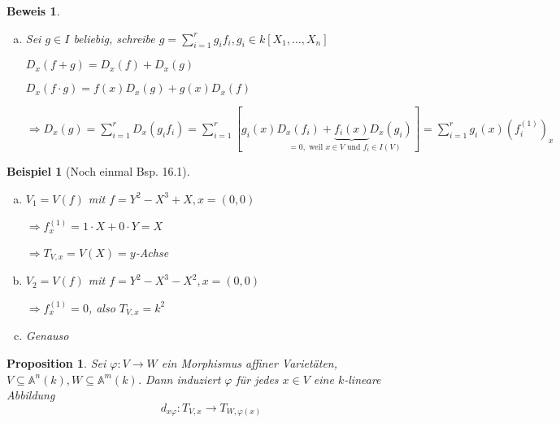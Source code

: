 \documentclass[a4paper, 12pt, numbers=noendperiod, chapterprefix=true, headsepline]{scrbook}
\theoremstyle{break}
\newtheorem{Prop}[Def]{Proposition}
\theoremstyle{nonumberbreak}
\newtheorem{nnBsp}{Beispiel}
\newtheorem{Bew}{Beweis}
\theoremstyle{nonumberplain}
\newcommand{\Sum}{\sum\limits}
\newcommand{\A}{\mathbb{A}}
\begin{document}
\begin{Bew}\begin{enumerate}[a)]\item[c)]
Sei $g\in I$ beliebig, schreibe $g=\Sum_{i=1}^r g_if_i, g_i\in k[X_1,\ldots ,X_n]$

$D_x(f+g)=D_x(f)+D_x(g)$

$D_x(f\cdot g)=f(x)D_x(g)+g(x)D_x(f)$

$\Rightarrow D_x(g)=\Sum_{i=1}^rD_x(g_if_i)=\Sum_{i=1}^r[g_i(x)\underset{=0, \text{ weil }x\in V \text{ und } f_i\in I(V)}{D_x(f_i)+\underbrace{f_i(x)}D_x(g_i)}] = \Sum_{i=1}^rg_i(x)(f_i^{(1)})_x$
\end{enumerate}\end{Bew}

\begin{nnBsp}[Noch einmal Bsp. 16.1]\begin{enumerate}[a)]
\item
	$V_1=V(f)$ mit $f=Y^2-X^3+X, x=(0,0)$
	
	$\Rightarrow f_x^{(1)}=1\cdot X+0\cdot Y=X$
	
	$\Rightarrow T_{V,x}=V(X)= y$-Achse
\item
	$V_2=V(f)$ mit $f=Y^2-X^3-X^2, x=(0,0)$
	
	$\Rightarrow f_x^{(1)}=0$, also $T_{V,x}=k^2$
\item
	Genauso
\end{enumerate}\end{nnBsp}

\begin{Prop}
Sei $\varphi:V\to W$ ein Morphismus affiner Variet\"aten, $V\subseteq \A^n(k), W\subseteq \A^m(k)$. Dann induziert $\varphi$ f\"ur jedes $x\in V$ eine $k$-lineare Abbildung
	\[ d_{x\varphi}: T_{V,x}\to T_{W,\varphi(x)} \]
\end{Prop}
\end{document}
